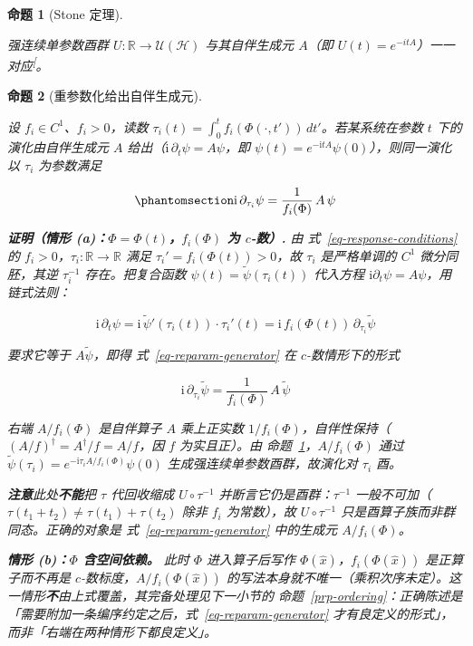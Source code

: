 \documentclass[
  chinese,
  a4paper,
  UTF8,
  12pt,
  oneside,
  openany]{ctexbook}
\theoremstyle{plain}
\theoremstyle{plain}
\theoremstyle{plain}
\newtheorem{proposition}{命题}[chapter]
\theoremstyle{definition}
\theoremstyle{plain}
\theoremstyle{plain}
\theoremstyle{remark}
\begin{document}
\begin{proposition}[Stone
定理]\protect\hypertarget{prp-stone}{}\label{prp-stone}

强连续单参数酉群 \(U:\mathbb{R}\to\mathcal{U}(\mathcal{H})\)
与其自伴生成元 \(A\)（即
\(U(t)=e^{-itA}\)）一一对应\textsuperscript{{[}\citeproc{ref-nielsenchuang2000}{29}{]}}。

\end{proposition}

\begin{proposition}[重参数化给出自伴生成元]\protect\hypertarget{prp-reparam}{}\label{prp-reparam}

设 \(f_i\in C^{1}\)、\(f_i>0\)，读数
\(\tau_i(t)=\int_{0}^{t}f_i(\Phi(\cdot,t'))\,dt'\)。若某系统在参数 \(t\)
下的演化由自伴生成元 \(A\)
给出（\(\mathrm{i}\,\partial_{t}\psi=A\psi\)，即
\(\psi(t)=e^{-\mathrm{i}tA}\psi(0)\)），则同一演化以 \(\tau_i\)
为参数满足

\begin{equation}\protect\phantomsection\label{eq-reparam-generator}{
\mathrm{i}\,\partial_{\tau_i}\psi=\frac{1}{f_i(\Phi)}\,A\,\psi
}\end{equation}

\textbf{证明（情形 (a)：\(\Phi=\Phi(t)\)，\(f_i(\Phi)\) 为 \(c\)-数）.}
由 式~\ref{eq-response-conditions} 的
\(f_i>0\)，\(\tau_i:\mathbb{R}\to\mathbb{R}\) 满足
\(\tau_i'=f_i(\Phi(t))>0\)，故 \(\tau_i\) 是严格单调的 \(C^{1}\)
微分同胚，其逆 \(\tau_i^{-1}\) 存在。把复合函数
\(\psi(t)=\tilde\psi(\tau_i(t))\) 代入方程
\(\mathrm{i}\partial_{t}\psi=A\psi\)，用链式法则：

\[
\mathrm{i}\,\partial_{t}\psi=\mathrm{i}\,\tilde\psi'(\tau_i(t))\cdot\tau_i'(t)
=\mathrm{i}\,f_i(\Phi(t))\,\partial_{\tau_i}\tilde\psi
\]

要求它等于 \(A\tilde\psi\)，即得 式~\ref{eq-reparam-generator} 在
\(c\)-数情形下的形式

\[
\mathrm{i}\,\partial_{\tau_i}\tilde\psi=\frac{1}{f_i(\Phi)}\,A\,\tilde\psi
\]

右端 \(A/f_i(\Phi)\) 是自伴算子 \(A\) 乘上正实数
\(1/f_i(\Phi)\)，自伴性保持（\((A/f)^{\dagger}=A^{\dagger}/f=A/f\)，因
\(f\) 为实且正）。由 命题~\ref{prp-stone}，\(A/f_i(\Phi)\) 通过
\(\tilde\psi(\tau_i)=e^{-\mathrm{i}\tau_i A/f_i(\Phi)}\psi(0)\)
生成强连续单参数酉群，故演化对 \(\tau_i\) 酉。

\textbf{注意}此处\textbf{不能}把 \(\tau\) 代回收缩成 \(U\circ\tau^{-1}\)
并断言它仍是酉群：\(\tau^{-1}\)
一般不可加（\(\tau(t_1+t_2)\neq\tau(t_1)+\tau(t_2)\) 除非 \(f_i\)
为常数），故 \(U\circ\tau^{-1}\) 只是酉算子族而非群同态。正确的对象是
式~\ref{eq-reparam-generator} 中的生成元 \(A/f_i(\Phi)\)。

\textbf{情形 (b)：\(\Phi\) 含空间依赖。} 此时 \(\Phi\) 进入算子后写作
\(\Phi(\hat x)\)，\(f_i(\Phi(\hat x))\) 是正算子而不再是
\(c\)-数标度，\(A/f_i(\Phi(\hat x))\)
的写法本身就不唯一（乘积次序未定）。这一情形\textbf{不}由上式覆盖，其完备处理见下一小节的
命题~\ref{prp-ordering}：正确陈述是「需要附加一条编序约定之后，式~\ref{eq-reparam-generator}
才有良定义的形式」，而非「右端在两种情形下都良定义」。

\end{proposition}
\end{document}
